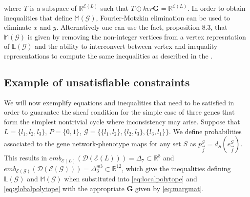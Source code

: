where $T$ is a subspace of $\mathbb{R}^{\mathcal{E}(L)}$ such that $T \oplus ker \mathbf{G} = \mathbb{R}^{\mathcal{E}(L)}$. In order to obtain inequalities that define $\mathbb{M}(\mathcal{G})$, Fourier-Motzkin elimination can be used to eliminate $x$ and $y$. Alternatively one can use the fact, \cite{Wainwright2007} proposition 8.3, that $\mathbb{M}(\mathcal{G})$ is given by removing the non-integer vertices from a vertex represntation of $\mathbb{L}(\mathcal{G})$ and the ability to interconvert between vertex and inequality representations to compute the same inequalities as described in the .

\subsection{Example of unsatisfiable constraints}\label{sec:inconsistency}
We will now exemplify equations and inequalities that need to be satisfied in order to guarantee the sheaf condition for the simple case of three genes that form the simplest nontrivial cycle where inconsistency may arise. Suppose that $L = \{l_1,l_2,l_3\}$, $P = \{0,1\}$, $\mathcal{G} = \{\{l_1,l_2\},\{l_2,l_3\},\{l_3,l_1\}\}$. We define probabilities associated to the gene network-phenotype maps for any set $S$ as $p^S_{\vec{j}}= d_{S}(e^S_{\vec{j}})$. This results in $emb_{\mathcal{E}(L)}(\mathcal{D}(\mathcal{E}(L))) = \Delta_7 \subset \mathbb{R}^8 $ and $emb_{\mathcal{E}(\mathcal{G})}(\mathcal{D}(\mathcal{E}(\mathcal{G}))) = \Delta^{\oplus 3}_3 \subset \mathbb{R}^{12}$,
which give the inequalities defining $\mathbb{L}(\mathcal{G})$ and $\mathbb{M}(\mathcal{G})$ when substituted into \ref{eq:localpolytope} and \ref{eq:globalpolytope} with the appropriate $\mathbf{G}$ given by \ref{eq:margmat}.

